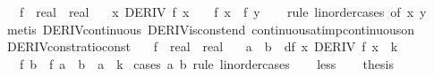 \begin{isabellebody}
\ \ \ f\ {\isacharcolon}{\kern0pt}{\isacharcolon}{\kern0pt}\ {\isachardoublequoteopen}real\ {\isasymRightarrow}\ real{\isachardoublequoteclose}\isanewline
\ \ \ {\isachardoublequoteopen}{\isasymforall}x{\isachardot}{\kern0pt}\ DERIV\ f\ x\ {\isacharcolon}{\kern0pt}{\isachargreater}{\kern0pt}\ {}\ {\isasymLongrightarrow}\ f\ x\ {\isacharequal}{\kern0pt}\ f\ y{\isachardoublequoteclose}\isanewline
%
\isadelimproof
\ \ %
\endisadelimproof
%
\isatagproof
{}\isamarkupfalse%
\ {\isacharparenleft}{\kern0pt}rule\ linorder{\isacharunderscore}{\kern0pt}cases\ {\isacharbrackleft}{\kern0pt}of\ x\ y{\isacharbrackright}{\kern0pt}{\isacharparenright}{\kern0pt}\isanewline
\ \ \isamarkupfalse%
\ {\isacharparenleft}{\kern0pt}metis\ DERIV{\isacharunderscore}{\kern0pt}continuous\ DERIV{\isacharunderscore}{\kern0pt}isconst{\isacharunderscore}{\kern0pt}end\ continuous{\isacharunderscore}{\kern0pt}at{\isacharunderscore}{\kern0pt}imp{\isacharunderscore}{\kern0pt}continuous{\isacharunderscore}{\kern0pt}on{\isacharparenright}{\kern0pt}{\isacharplus}{\kern0pt}\isanewline
\ \ \isamarkupfalse%
%
\endisatagproof
{\isafoldproof}%
%
\isadelimproof
\isanewline
%
\endisadelimproof
\isanewline
{}\isamarkupfalse%
\ DERIV{\isacharunderscore}{\kern0pt}const{\isacharunderscore}{\kern0pt}ratio{\isacharunderscore}{\kern0pt}const{\isacharcolon}{\kern0pt}\isanewline
\ \ \ f\ {\isacharcolon}{\kern0pt}{\isacharcolon}{\kern0pt}\ {\isachardoublequoteopen}real\ {\isasymRightarrow}\ real{\isachardoublequoteclose}\isanewline
\ \ \ {\isachardoublequoteopen}a\ {\isasymnoteq}\ b{\isachardoublequoteclose}\ \ df{\isacharcolon}{\kern0pt}\ {\isachardoublequoteopen}{\isasymAnd}x{\isachardot}{\kern0pt}\ DERIV\ f\ x\ {\isacharcolon}{\kern0pt}{\isachargreater}{\kern0pt}\ k{\isachardoublequoteclose}\isanewline
\ \ \ {\isachardoublequoteopen}f\ b\ {\isacharminus}{\kern0pt}\ f\ a\ {\isacharequal}{\kern0pt}\ {\isacharparenleft}{\kern0pt}b\ {\isacharminus}{\kern0pt}\ a{\isacharparenright}{\kern0pt}\ {\isacharasterisk}{\kern0pt}\ k{\isachardoublequoteclose}\isanewline
%
\isadelimproof
%
\endisadelimproof
%
\isatagproof
{}\isamarkupfalse%
\ {\isacharparenleft}{\kern0pt}cases\ a\ b\ rule{\isacharcolon}{\kern0pt}\ linorder{\isacharunderscore}{\kern0pt}cases{\isacharparenright}{\kern0pt}\isanewline
\ \ \isamarkupfalse%
\ less\isanewline
\ \ \isamarkupfalse%
\ {\isacharquery}{\kern0pt}thesis\isanewline

\end{isabellebody}
